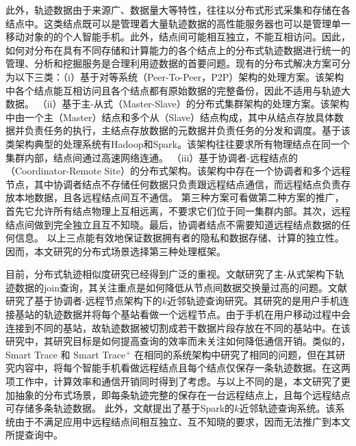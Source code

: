          此外，轨迹数据由于来源广、数据量大等特性，往往以分布式形式采集和存储在各结点中。这类结点既可以是管理着大量轨迹数据的高性能服务器也可以是管理单一移动对象的的个人智能手机。此外，结点间可能相互独立，不能互相访问。因此，
         如何对分布在具有不同存储和计算能力的各个结点上的分布式轨迹数据进行统一的管理、分析和挖掘服务是合理利用迹数据的首要问题。现有的分布式解决方案可分为以下三类：（i）基于对等系统（Peer-To-Peer，P2P）架构的处理方案。该架构中各个结点能互相访问且各个结点都有原始数据的完整备份，因此不适用与轨迹大数据。
         （ii）基于主-从式（Master-Slave）的分布式集群架构的处理方案。该架构中由一个主（Master）结点和多个从（Slave）结点构成，其中从结点存放具体数据并负责任务的执行，主结点存放数据的元数据并负责任务的分发和调度。基于该类架构典型的处理系统有Hadoop和Spark。该架构往往要求所有物理结点在同一个集群内部，结点间通过高速网络连通。
         （iii）基于协调者-远程结点的（Coordinator-Remote Site）的分布式架构。该架构中存在一个协调者和多个远程节点，其中协调者结点不存储任何数据只负责跟远程结点通信，而远程结点负责存放本地数据，且各远程结点间互不通信。 
         第三种方案可看做第二种方案的推广，首先它允许所有结点物理上互相远离，不要求它们位于同一集群内部。其次，远程结点间做到完全独立且互不知晓。最后，协调者结点不需要知道远程结点数据的任何信息。
         以上三点能有效地保证数据拥有者的隐私和数据存储、计算的独立性。因而，本文研究的分布式场景选择第三种处理框架。
  
  目前，分布式轨迹相似度研究已经得到广泛的重视。文献\cite{setSimilar,kimICDE2012}研究了主-从式架构下轨迹数据的join查询，其关注重点是如何降低从节点间数据交换量过高的问题。文献\cite{KDDSimilarity} 研究了基于协调者-远程节点架构下的$k$近邻轨迹查询研究。其研究的是用户手机连接基站的轨迹数据并将每个基站看做一个远程节点。由于手机在用户移动过程中会连接到不同的基站，故轨迹数据被切割成若干数据片段存放在不同的基站中。在该研究中，其研究目标是如何提高查询的效率而未关注如何降低通信开销。类似的，
Smart Trace\cite{SmartTrace} 和 Smart Trace$^{+}$ \cite{crowdsourced} 在相同的系统架构中研究了相同的问题，但在其研究内容中，将每个智能手机看做远程结点且每个结点仅保存一条轨迹数据。在这两项工作中，计算效率和通信开销同时得到了考虑。与以上不同的是，本文研究了更加抽象的分布式场景，即每条轨迹完整的保存在一台远程结点上，且每个远程结点可存储多条轨迹数据。
此外，文献\cite{trajectoryVLDB}提出了基于Spark的$k$近邻轨迹查询系统。该系统由于不满足应用中远程结点间相互独立、互不知晓的要求，因而无法推广到本文所提查询中。
  
